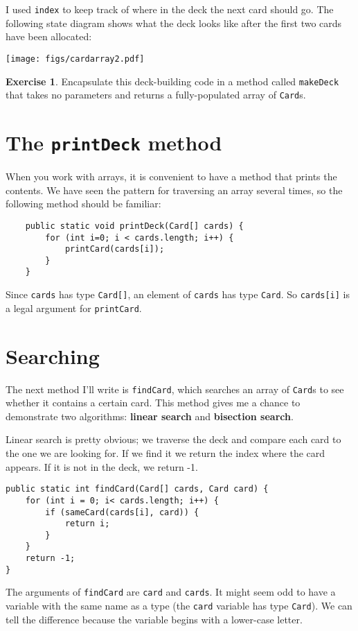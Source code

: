 \documentclass[12pt]{book}
\theoremstyle{definition}
\newtheorem{excz}{Exercise}[chapter]
\newenvironment{exercise}{\bigskip\begin{excz}\mbox{}}{\end{excz}}
\begin{document}

I used {\tt index} to keep track of where in the
deck the next card should go.  The following state diagram
shows what the deck looks like after the first two cards
have been allocated:

\texttt{[image: figs/cardarray2.pdf]}

\begin{exercise}
Encapsulate this deck-building code in a method called
{\tt makeDeck} that takes no parameters and returns a
fully-populated array of {\tt Card}s.
\end{exercise}


\section{The {\tt printDeck} method}
\label{printdeck}

When you work with arrays, it is convenient to have
a method that prints the contents.  We have
seen the pattern for traversing an array several times, so the
following method should be familiar:

\begin{lstlisting}
    public static void printDeck(Card[] cards) {
        for (int i=0; i < cards.length; i++) {
            printCard(cards[i]);
        }
    }
\end{lstlisting}

Since {\tt cards} has type {\tt Card[]}, an element of {\tt cards}
has type {\tt Card}.  So {\tt cards[i]} is a legal argument
for {\tt printCard}.


\section{Searching}
\label{findcard}

The next method I'll write is {\tt findCard}, which searches
an array of {\tt Card}s to see whether it contains a certain
card.  This method
gives me a chance to demonstrate two algorithms:
{\bf linear search} and {\bf bisection search}.

Linear search is pretty obvious; we traverse
the deck and compare each card to the one we are looking for.  If we
find it we return the index where the card appears.  If it is not in
the deck, we return -1.

\begin{lstlisting}
public static int findCard(Card[] cards, Card card) {
    for (int i = 0; i< cards.length; i++) {
        if (sameCard(cards[i], card)) {
            return i;
        }
    }
    return -1;
}
\end{lstlisting}
%
The arguments of {\tt findCard} are {\tt card} and {\tt cards}.
It might seem odd to have a variable with the same name as a type (the
{\tt card} variable has type {\tt Card}).  We can tell the difference
because the variable begins with a lower-case letter.
\end{document}
